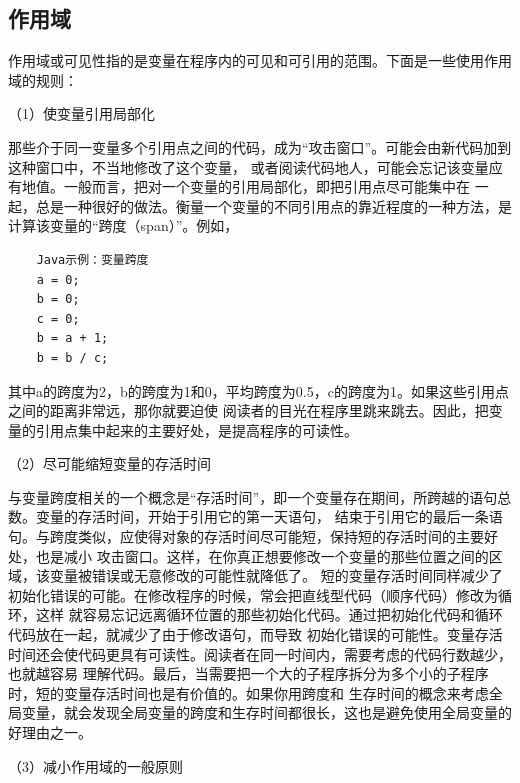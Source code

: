 \documentclass{article}
\begin{document}
\subsection{作用域}
作用域或可见性指的是变量在程序内的可见和可引用的范围。下面是一些使用作用域的规则：
\par
（1）使变量引用局部化
\par
那些介于同一变量多个引用点之间的代码，成为“攻击窗口”。可能会由新代码加到这种窗口中，不当地修改了这个变量，
或者阅读代码地人，可能会忘记该变量应有地值。一般而言，把对一个变量的引用局部化，即把引用点尽可能集中在
一起，总是一种很好的做法。衡量一个变量的不同引用点的靠近程度的一种方法，是计算该变量的“跨度（span）”。例如，
\begin{lstlisting}
    Java示例：变量跨度
    a = 0;
    b = 0;
    c = 0;
    b = a + 1;
    b = b / c;
\end{lstlisting}
其中a的跨度为2，b的跨度为1和0，平均跨度为0.5，c的跨度为1。如果这些引用点之间的距离非常远，那你就要迫使
阅读者的目光在程序里跳来跳去。因此，把变量的引用点集中起来的主要好处，是提高程序的可读性。
\par
（2）尽可能缩短变量的存活时间
\par
与变量跨度相关的一个概念是“存活时间”，即一个变量存在期间，所跨越的语句总数。变量的存活时间，开始于引用它的第一天语句，
结束于引用它的最后一条语句。与跨度类似，应使得对象的存活时间尽可能短，保持短的存活时间的主要好处，也是减小
攻击窗口。这样，在你真正想要修改一个变量的那些位置之间的区域，该变量被错误或无意修改的可能性就降低了。
短的变量存活时间同样减少了初始化错误的可能。在修改程序的时候，常会把直线型代码（顺序代码）修改为循环，这样
就容易忘记远离循环位置的那些初始化代码。通过把初始化代码和循环代码放在一起，就减少了由于修改语句，而导致
初始化错误的可能性。变量存活时间还会使代码更具有可读性。阅读者在同一时间内，需要考虑的代码行数越少，也就越容易
理解代码。最后，当需要把一个大的子程序拆分为多个小的子程序时，短的变量存活时间也是有价值的。如果你用跨度和
生存时间的概念来考虑全局变量，就会发现全局变量的跨度和生存时间都很长，这也是避免使用全局变量的好理由之一。
\par
（3）减小作用域的一般原则
\par
\end{document}
